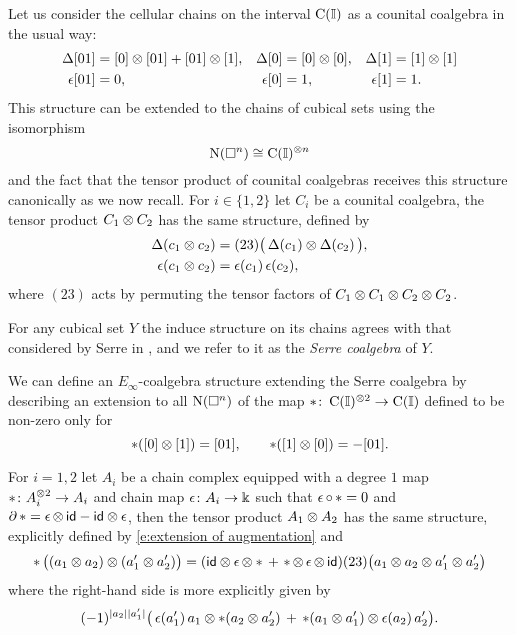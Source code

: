 Let us consider the cellular chains on the interval $\operatorname{C}(\mathbb{I})$ as a counital coalgebra in the usual way:
\begin{align*}
\operatorname{\Delta}[01] &= [0] \otimes [01] + [01] \otimes [1], &
\operatorname{\Delta}[0]  &= [0] \otimes [0], &
\operatorname{\Delta}[1]  &= [1] \otimes [1] \\
\operatorname{\epsilon}[01] &= 0, &
\operatorname{\epsilon}[0]  &= 1, &
\operatorname{\epsilon} [1]  &= 1.
\end{align*}
This structure can be extended to the chains of cubical sets using the isomorphism
\[
\operatorname{N}(\square^n) \cong \operatorname{C}(\mathbb{I})^{\otimes n}
\]
and the fact that the tensor product of counital coalgebras receives this structure canonically as we now recall.
For $i \in \{1,2\}$ let $C_i$ be a counital coalgebra, the tensor product $C_1 \otimes C_2$ has the same structure, defined by
\begin{align} \label{e:extension of coproduct}
\operatorname{\Delta}(c_1 \otimes c_2) &= (23) \big( \operatorname{\Delta}(c_1) \otimes \operatorname{\Delta}(c_2) \, \big), \\
\label{e:extension of augmentation}
\operatorname{\epsilon}(c_1 \otimes c_2) &= \operatorname{\epsilon}(c_1) \operatorname{\epsilon}(c_2),
\end{align}
where $(23)$ acts by permuting the tensor factors of $C_1 \otimes C_1 \otimes C_2 \otimes C_2$.

For any cubical set $Y$ the induce structure on its chains agrees with that considered by Serre in \cite{serre1951homologie}, and we refer to it as the \textit{Serre coalgebra} of $Y$.

We can define an $E_\infty$-coalgebra structure extending the Serre coalgebra by describing an extension to all $\operatorname{N}(\square^n)$ of the map $\ast \colon \operatorname{C}(\mathbb{I})^{\otimes 2} \to \operatorname{C}(\mathbb{I})$ defined to be non-zero only for
\[
\ast([0] \otimes [1]) = [01], \qquad
\ast([1] \otimes [0]) = - [01].
\]

For $i = 1,2$ let $A_i$ be a chain complex equipped with a degree $1$ map $\operatorname{\ast} \colon A_i^{\otimes 2} \to A_i$ and chain map $\operatorname{\epsilon} \colon A_i \to \Bbbk$ such that $\operatorname{\epsilon} \circ \operatorname{\ast} = 0$ and $\partial \operatorname{\ast} = \operatorname{\epsilon} \otimes \, \mathsf{id} - \mathsf{id} \otimes \operatorname{\epsilon}$, then the tensor product $A_1 \otimes A_2$ has the same structure, explicitly defined by \eqref{e:extension of augmentation} and
\begin{equation} \label{e:extension of product}
\operatorname{\ast} \big( (a_1 \otimes a_2) \otimes (a_1^\prime \otimes a_2^\prime)\big) =
(\mathsf{id} \otimes \operatorname{\epsilon} \otimes \ast \, + \, \operatorname{\ast} \otimes \operatorname{\epsilon} \otimes \, \mathsf{id})(23)
\big( a_1 \otimes a_2 \otimes a_1^\prime \otimes a_2^\prime \big)
\end{equation}
where the right-hand side is more explicitly given by
\[
(-1)^{\lvert a_2\rvert \lvert a_1^\prime\rvert} \big( \operatorname{\epsilon}(a_1^\prime) \, a_1 \otimes \ast (a_2 \otimes a_2^\prime)  \, + \, \operatorname{\ast}(a_1 \otimes a_1^\prime) \otimes \operatorname{\epsilon}(a_2) \, a_2^\prime \big).
\]

